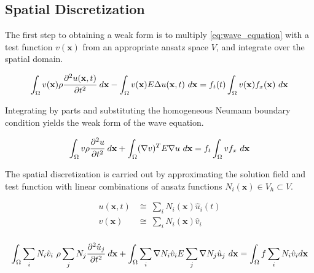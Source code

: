 \subsection*{Spatial Discretization}
\label{subsection:wave_equation_spatial_discretization}

The first step to obtaining a weak form is to multiply \ref{eq:wave_equation} with a test function $v(\mathbf x)$ from an appropriate ansatz space $V$, and integrate over the spatial domain.

\begin{equation}
	\int_{\Omega} v(\mathbf x) \rho \cfrac{\partial^2 u(\mathbf x, t)}{\partial t^2} \ d \mathbf x
	-
	\int_{\Omega} v(\mathbf x) E \Delta u(\mathbf x, t) \ d \mathbf x
	=
	f_t(t) \int_{\Omega} v(\mathbf x) f_x(\mathbf x) \ d \mathbf x
\end{equation}

Integrating by parts and substituting the homogeneous Neumann boundary condition yields the weak form of the wave equation.

\begin{equation} \label{eq:wave_equation_weak_form}
	\int_{\Omega} v \rho \cfrac{\partial^2 u}{\partial t^2} \ d \mathbf x
	+
	\int_{\Omega} (\nabla v)^T E \nabla u \ d \mathbf x
	=
	f_t \int_{\Omega} v f_x \ d \mathbf x
\end{equation}

The spatial discretization is carried out by approximating the solution field and test function with linear combinations of ansatz functions $N_i(\mathbf x) \in V_h \subset V$.

\begin{equation}
	\begin{array}{rl}
		u(\mathbf x, t) &\cong \ \sum_i N_i(\mathbf x) \hat u_i(t) \\
		v(\mathbf x) &\cong \ \sum_i N_i(\mathbf x) \hat v_i \\
	\end{array}
\end{equation}

\begin{equation} \label{eq:wave_equation_spatially_discretized_test}
	\int_{\Omega} \sum_i N_i \hat v_i \ \rho \sum_j N_j \cfrac{\partial^2 \hat u_j}{\partial t^2} \ d \mathbf x
	+
	\int_{\Omega} \sum_i \nabla N_i \hat v_i E \sum_j \nabla N_j \hat u_j \ d \mathbf x
	=
	\int_{\Omega} f \sum_i N_i \hat v_i d \mathbf x
\end{equation}

